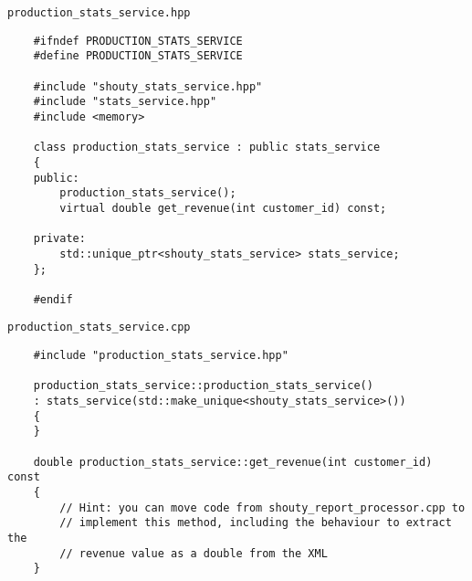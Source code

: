 \texttt{production_stats_service.hpp}

\begin{verbatim}
    #ifndef PRODUCTION_STATS_SERVICE
    #define PRODUCTION_STATS_SERVICE
    
    #include "shouty_stats_service.hpp"
    #include "stats_service.hpp"
    #include <memory>
    
    class production_stats_service : public stats_service
    {
    public:
        production_stats_service();
        virtual double get_revenue(int customer_id) const;
    
    private:
        std::unique_ptr<shouty_stats_service> stats_service;
    };
    
    #endif

\end{verbatim}

\texttt{production_stats_service.cpp}

\begin{verbatim}
    #include "production_stats_service.hpp"
    
    production_stats_service::production_stats_service()
    : stats_service(std::make_unique<shouty_stats_service>())
    {
    }
    
    double production_stats_service::get_revenue(int customer_id) const
    {
        // Hint: you can move code from shouty_report_processor.cpp to
        // implement this method, including the behaviour to extract the
        // revenue value as a double from the XML
    }
\end{verbatim}